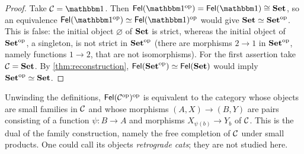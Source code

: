 \begin{proof}
Take $\cC=\one$. Then $\Fel(\one^{\op})=\Fel(\one)\iso\Set$, so an equivalence
$\Fel(\one^{\op})\eqv\Fel(\one)^{\op}$ would give $\mathbf{Set}\simeq\mathbf{Set}^{\mathrm{op}}$. This is false: the initial object
$\varnothing$ of $\mathbf{Set}$ is strict, whereas the initial object of $\mathbf{Set}^{\mathrm{op}}$,
a singleton, is not strict in $\mathbf{Set}^{\mathrm{op}}$ (there are morphisms
$2\to1$ in $\mathbf{Set}^{\mathrm{op}}$, namely functions $1\to2$, that are not isomorphisms).
For the first assertion take $\mathcal{C}=\mathbf{Set}$. By \cref{thm:reconstruction},
$\mathsf{Fel}(\mathbf{Set}^{\mathrm{op}})\simeq\mathsf{Fel}(\mathbf{Set})$ would imply $\mathbf{Set}^{\mathrm{op}}\simeq\mathbf{Set}$.
\end{proof}

\begin{remark}\label{rem:retrograde}
Unwinding the definitions, $\mathsf{Fel}(\mathcal{C}^{\mathrm{op}})^{\mathrm{op}}$ is equivalent to the
category whose objects are small families in $\mathcal{C}$ and whose morphisms
$(A,X)\to(B,Y)$ are pairs consisting of a function $\psi\colon B\to A$ and
morphisms $X_{\psi(b)}\to Y_b$ of $\mathcal{C}$. This is the dual of the family
construction, namely the free completion of $\mathcal{C}$ under small products. One
could call its objects \emph{retrograde cats}; they are not studied here.
\end{remark}
